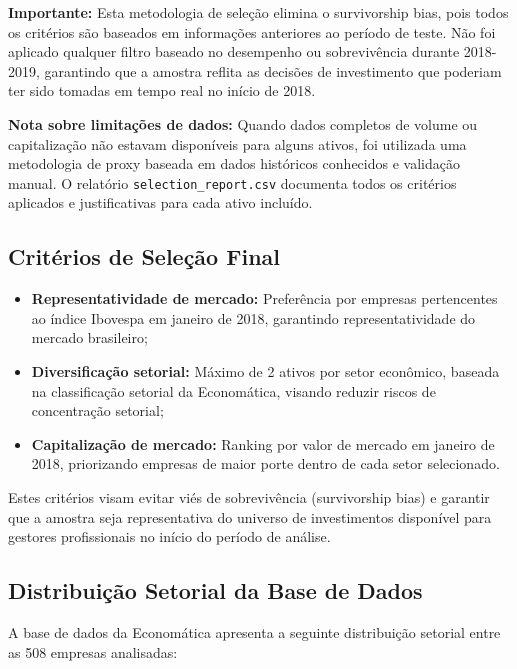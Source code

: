 \textbf{Importante:} Esta metodologia de seleção elimina o survivorship bias, pois todos os critérios são baseados em informações anteriores ao período de teste. Não foi aplicado qualquer filtro baseado no desempenho ou sobrevivência durante 2018-2019, garantindo que a amostra reflita as decisões de investimento que poderiam ter sido tomadas em tempo real no início de 2018.

\textbf{Nota sobre limitações de dados:} Quando dados completos de volume ou capitalização não estavam disponíveis para alguns ativos, foi utilizada uma metodologia de proxy baseada em dados históricos conhecidos e validação manual. O relatório \texttt{selection\_report.csv} documenta todos os critérios aplicados e justificativas para cada ativo incluído.

\subsection{Critérios de Seleção Final}

\begin{itemize}
    \item \textbf{Representatividade de mercado:} Preferência por empresas pertencentes ao índice Ibovespa em janeiro de 2018, garantindo representatividade do mercado brasileiro;
    
    \item \textbf{Diversificação setorial:} Máximo de 2 ativos por setor econômico, baseada na classificação setorial da Economática, visando reduzir riscos de concentração setorial;
    
    \item \textbf{Capitalização de mercado:} Ranking por valor de mercado em janeiro de 2018, priorizando empresas de maior porte dentro de cada setor selecionado.
\end{itemize}

Estes critérios visam evitar viés de sobrevivência (survivorship bias) e garantir que a amostra seja representativa do universo de investimentos disponível para gestores profissionais no início do período de análise.

\subsection{Distribuição Setorial da Base de Dados}

A base de dados da Economática apresenta a seguinte distribuição setorial entre as 508 empresas analisadas:

